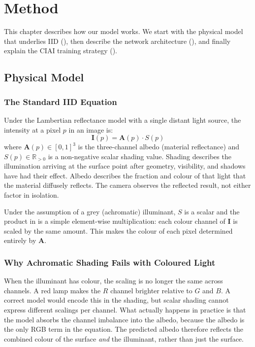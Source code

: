 \chapter{Method}
\label{ch:method}

This chapter describes how our model works.
We start with the physical model that underlies IID (),
then describe the network architecture (),
and finally explain the CIAI training strategy ().


\section{Physical Model}
\label{sec:physics}

\subsection{The Standard IID Equation}

Under the Lambertian reflectance model with a single distant light source,
the intensity at a pixel $p$ in an image is:
\begin{equation}
  \mathbf{I}(p) = \mathbf{A}(p) \cdot S(p)
  \label{eq:iid}
\end{equation}
where $\mathbf{A}(p) \in [0,1]^3$ is the three-channel albedo (material
reflectance) and $S(p) \in \mathbb{R}_{>0}$ is a non-negative scalar shading
value. Shading describes the illumination arriving at the surface point after
geometry, visibility, and shadows have had their effect. Albedo describes the
fraction and colour of that light that the material diffusely reflects. The
camera observes the reflected result, not either factor in isolation.

Under the assumption of a grey (achromatic) illuminant, $S$ is a scalar and the
product in  is a simple element-wise multiplication: each colour
channel of $\mathbf{I}$ is scaled by the same amount.
This makes the colour of each pixel determined entirely by $\mathbf{A}$.

\subsection{Why Achromatic Shading Fails with Coloured Light}

When the illuminant has colour, the scaling is no longer the same across channels.
A red lamp makes the $R$ channel brighter relative to $G$ and $B$.
A correct model would encode this in the shading, but scalar shading cannot express
different scalings per channel.
What actually happens in practice is that the model absorbs the channel imbalance
into the albedo, because the albedo is the only RGB term in the equation.
The predicted albedo therefore reflects the combined colour of the surface
\emph{and} the illuminant, rather than just the surface.

